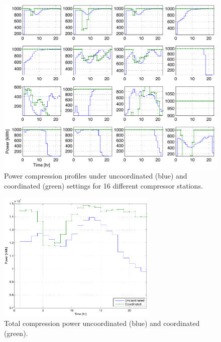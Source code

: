 \documentclass[11pt,twoside]{article}
\begin{document}
\begin{figure}[h!]
\begin{center}
\includegraphics[width=4.5in]{power_coupled_decoupled.pdf}\caption{Power compression profiles under uncoordinated (blue) and coordinated (green) settings for 16 different compressor stations.}\label{power}
\end{center}
\end{figure}

\begin{figure}[h!]
\begin{center}
\includegraphics[width=3in]{power_total.pdf}\caption{Total compression power uncoordinated (blue) and coordinated (green).}\label{powertotal}
\end{center}
\end{figure}
\end{document}

